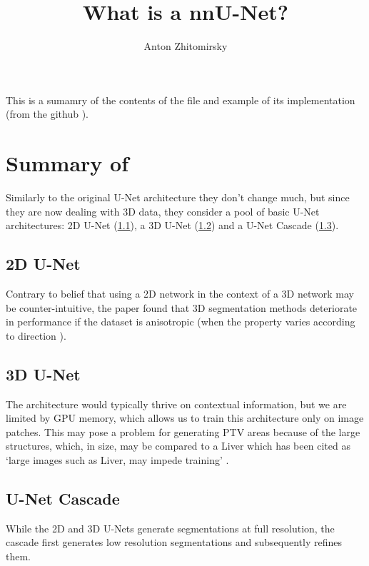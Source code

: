 \documentclass[11pt]{article}
\title{What is a nnU-Net?}
\author{Anton Zhitomirsky}
\begin{document}
\maketitle

This is a sumamry of the contents of the file \cite{nnunet} and example of its implementation (from the github \cite{nnunet-git-paper}).

\section{Summary of \cite{nnunet}}

Similarly to the original U-Net architecture they don't change much, but since they are now dealing with 3D data, they consider a pool of basic U-Net architectures: 2D U-Net (\ref{sec:2d-u-net}), a 3D U-Net (\ref{sec:3d-u-net}) and a U-Net Cascade (\ref{sec:u-net-cascade}).

\subsection{2D U-Net} \label{sec:2d-u-net}

Contrary to belief that using a 2D network in the context of a 3D network may be counter-intuitive, the paper found that 3D segmentation methods deteriorate in performance if the dataset is anisotropic \cite{nnunet} (when the property varies according to direction \cite{anisotropy}).

\subsection{3D U-Net}\label{sec:3d-u-net}

The architecture would typically thrive on contextual information, but we are limited by GPU memory, which allows us to train this architecture only on image patches. This may pose a problem for generating PTV areas because of the large structures, which, in size, may be compared to a Liver which has been cited as `large images such as Liver, may impede training' \cite{nnunet}.

\subsection{U-Net Cascade} \label{sec:u-net-cascade}

While the 2D and 3D U-Nets generate segmentations at full resolution, the cascade first generates low resolution segmentations and subsequently refines them.
\end{document}
